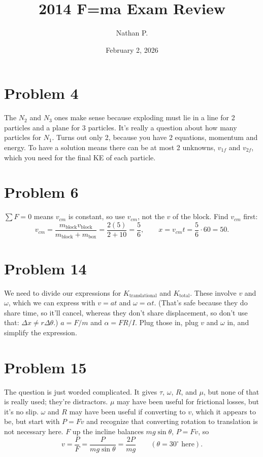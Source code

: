 \documentclass[11pt]{article}
\title{2014 F=ma Exam Review}
\author{Nathan P.}
\date{February 2, 2026}
\begin{document}
\maketitle

\section*{Problem 4}
The $N_2$ and $N_3$ ones make sense because exploding must lie in a line for 2 particles and a plane for 3 particles.
It's really a question about how many particles for $N_1$. Turns out only 2, because you have 2 equations, momentum and energy. To have a solution means there can be at most 2 unknowns, $v_{1f}$ and $v_{2f}$, which you need for the final KE of each particle.

\section*{Problem 6}
$\sum F=0$ means $v_{cm}$ is constant, so use $v_{cm}$, not the $v$ of the block. Find $v_{cm}$ first:
\[
v_{cm}=\frac{m_{\text{block}}v_{\text{block}}}{m_{\text{block}}+m_{\text{box}}}=\frac{2(5)}{2+10}=\frac56,
\qquad
x=v_{cm}t=\frac56\cdot 60=50.
\]

\section*{Problem 14}
We need to divide our expressions for $K_{\text{translational}}$ and $K_{\text{total}}$. These involve $v$ and $\omega$, which we can express with $v=at$ and $\omega=\alpha t$. (That's safe because they do share time, so it'll cancel, whereas they don't share displacement, so don't use that: $\Delta x\neq r\Delta\theta$.)
$a=F/m$ and $\alpha=FR/I$. Plug those in, plug $v$ and $\omega$ in, and simplify the expression.

\section*{Problem 15}
The question is just worded complicated. It gives $\tau$, $\omega$, $R$, and $\mu$, but none of that is really used; they're distractors. $\mu$ may have been useful for frictional losses, but it's no slip. $\omega$ and $R$ may have been useful if converting to $v$, which it appears to be, but start with $P=Fv$ and recognize that converting rotation to translation is not necessary here.
$F$ up the incline balances $mg\sin\theta$, $P=Fv$, so
\[
v=\frac{P}{F}=\frac{P}{mg\sin\theta}=\frac{2P}{mg}\qquad(\theta=30^\circ\text{ here}).
\]
\end{document}

